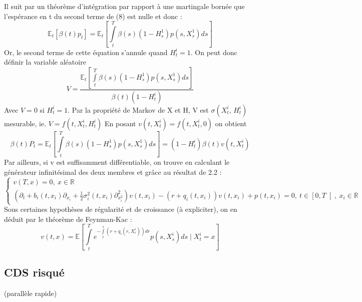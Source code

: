 \documentclass[a4paper]{article}
\begin{document}
Il suit par un théorème d'intégration par rapport à une martingale bornée que l'espérance en t du second terme de (8) est nulle et donc :
\begin{equation*}
\mathbb{E}_{t} \left[ \beta(t)p_{t} \right] =  \mathbb{E}_{t} \left[ \int \limits_{t}^{T}\beta(s)(1-H^{1}_{s})p(s, X^{1}_s)ds \right]
\end{equation*}
Or, le second terme de cette équation s'annule quand $H^i_t = 1$. On peut donc définir la variable aléatoire
\begin{equation*}
V = \frac{\mathbb{E}_{t} \left[ \int \limits_{t}^{T}\beta(s)(1-H^{1}_{s})p(s, X^{1}_s)ds \right]}{\beta(t)(1- H^i_t)}
\end{equation*}
Avec $V=0$ si $H^i_t = 1$. Par la propriété de Markov de X et H, V est $\sigma(X_t^i,\, H^i_t)$ mesurable, ie. $V = f(t,X^i_t, H^i_t)$ En posant $v(t, X^i_t) = f(t,X^i_t, 0)$ on obtient 
\begin{equation*}
\beta(t)P_{t} =  \mathbb{E}_{t} \left[ \int \limits_{t}^{T}\beta(s)(1-H^{1}_{s})p(s, X^{1}_s)ds \right] = (1 - H^i_t)\beta(t)v(t,X_t^i)
\end{equation*}
Par ailleurs, si v est suffisamment différentiable, on trouve en calculant le générateur infinitésimal des deux membres et grâce au résultat de 2.2 :
\begin{equation}
\left\{
\begin{split}
v(T, x) = 0,\ x \in \mathbb{R} \\
\left(\partial_t + b_i(t,x_i)\partial_{x_i} + \frac{1}{2}\sigma_i^2(t,x_i)\partial^2_{x^2_i}\right)v(t,x_i) - (r+q_i(t,x_i))v(t,x_i) + p(t,x_i) =0, \ t\in\left[0,T\right[,\ x_i \in \mathbb{R}
\end{split}
\right.
\end{equation}
Sous certaines hypothèses de régularité et de croissance (à expliciter), on en déduit par le théorème de Feynman-Kac :
\begin{equation}
v(t,x) = \mathbb{E} \left[ \int \limits_t^T e^{-\int \limits_{t}^{s} (r + q_i(r, X^i_r))dr} p(s, X^i_s)ds \mid X^i_t = x\right]
\end{equation}

\subsection{CDS risqué}
(parallèle rapide)
\end{document}
